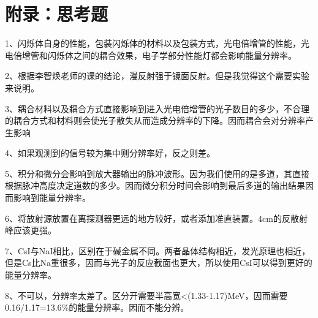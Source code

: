 \documentclass[a4paper,10.0pt,twoside]{npr}
\begin{document}
\newpage


\section*{附录：思考题}
1、闪烁体自身的性能，包装闪烁体的材料以及包装方式，光电倍增管的性能，光电倍增管和闪烁体之间的耦合效果，电子学部分性能灯都会影响能量分辨率。

2、根据李智焕老师的课的结论，漫反射强于镜面反射。但是我觉得这个需要实验来说明。

3、耦合材料以及耦合方式直接影响到进入光电倍增管的光子数目的多少，不合理的耦合方式和材料则会使光子散失从而造成分辨率的下降。因而耦合会对分辨率产生影响

4、如果观测到的信号较为集中则分辨率好，反之则差。

5、积分和微分会影响到放大器输出的脉冲波形。因为我们使用的是多道，其直接根据脉冲高度决定道数的多少。因而微分积分时间会影响到最后多道的输出结果因而影响到能量分辨率。

6、将放射源放置在离探测器更远的地方较好，或者添加准直装置。4cm的反散射峰应该更强。

7、CsI与NaI相比，区别在于碱金属不同。两者晶体结构相近，发光原理也相近，但是Cs比Na重很多，因而与光子的反应截面也更大，所以使用CsI可以得到更好的能量分辨率。

8、不可以，分辨率太差了。区分开需要半高宽<(1.33-1.17)MeV，因而需要0.16/1.17=13.6\%的能量分辨率。因而不能分辨。
\clearpage
\end{document}
